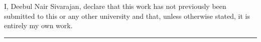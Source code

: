 \thispagestyle{empty}
\hbox{}
\vfill
\noindent
I, Deebul Nair Sivarajan, declare that this work has not previously been submitted to this or any other university and that, unless otherwise stated, it is entirely my own work.
\vskip 60pt

\hrule width 2.5cm
\hfill \hspace{5cm}
\hrulefill
\vskip -4pt

\clearpage